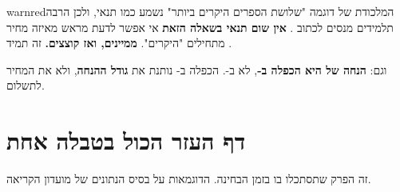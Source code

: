 \documentclass[11pt,a4paper]{article}
\begin{document}
\begin{notepanel}{warnred}{המלכודת של דוגמה }
"שלושת הספרים היקרים ביותר" נשמע כמו תנאי, ולכן הרבה תלמידים מנסים לכתוב . \textbf{אין שום תנאי בשאלה הזאת} \textendash{} אי אפשר לדעת מראש מאיזה מחיר מתחילים "היקרים". \textbf{ממיינים, ואז קוצצים.} זה תמיד .

\vspace{3pt}
וגם: \textbf{הנחה של  היא הכפלה ב-}, לא ב-. הכפלה ב- נותנת את \textbf{גודל ההנחה}, ולא את המחיר לתשלום.
\end{notepanel}

\newpage
\section{דף העזר \textendash{} הכול בטבלה אחת}

{\small זה הפרק שתסתכלו בו בזמן הבחינה. הדוגמאות על בסיס הנתונים של מועדון הקריאה.}
\end{document}
